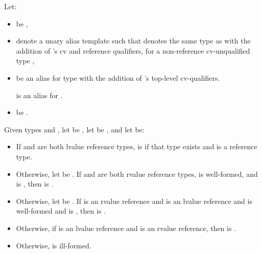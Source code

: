 %
\pnum
Let:
\begin{itemize}
\item {} be
  ,
\item {} denote a unary alias template 
  such that  denotes the same type as  with the addition
  of 's cv and reference qualifiers, for a non-reference cv-unqualified
  type ,
\item {} be an alias for type 
  with the addition of 's top-level cv-qualifiers.
  \begin{example}
     is an alias for
    .
  \end{example}
\item {} be
  .
\end{itemize}
Given types  and ,
let  be ,
let  be , and
let  be:
\begin{itemize}
\item If  and  are both lvalue reference types,
   is
   if that type exists
  and is a reference type.
\item Otherwise, let  be
  .
  If  and  are both rvalue reference types,
   is well-formed, and
   is ,
  then  is .
\item Otherwise, let  be
  . If  is an rvalue
  reference and  is an lvalue reference and  is
  well-formed and  is
  , then  is .
\item Otherwise, if  is an lvalue reference and 
  is an rvalue reference, then  is
  .
\item Otherwise,  is ill-formed.
\end{itemize}

